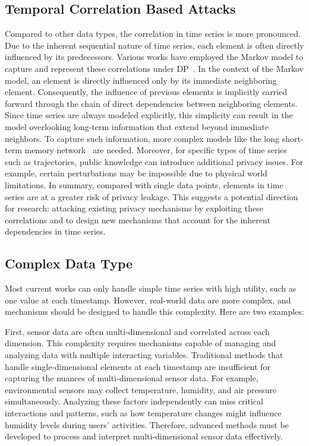 \subsection{Temporal Correlation Based Attacks}
Compared to other data types, the correlation in time series is more pronounced. Due to the inherent sequential nature of time series, each element is often directly influenced by its predecessors. Various works have employed the Markov model to capture and represent these correlations under DP~\cite{cao2017quantifying, xiao2017loclok, gursoy2018differentially}. In the context of the Markov model, an element is directly influenced only by its immediate neighboring element. Consequently, the influence of previous elements is implicitly carried forward through the chain of direct dependencies between neighboring elements.
Since time series are always modeled explicitly, this simplicity can result in the model overlooking long-term information that extend beyond immediate neighbors. To capture such information, more complex models like the long short-term memory network~\cite{shi2015convolutional} are needed. Moreover, for specific types of time series such as trajectories, public knowledge can introduce additional privacy issues. For example, certain perturbations may be impossible due to physical world limitations. In summary, compared with single data points, elements in time series are at a greater risk of privacy leakage. This suggests a potential direction for research: attacking existing privacy mechanisms by exploiting these correlations and to design new mechanisms that account for the inherent dependencies in time series. 



\subsection{Complex Data Type}
Most current works can only handle simple time series with high utility, such as one value at each timestamp. However, real-world data are more complex, and mechanisms should be designed to handle this complexity. Here are two examples:

First, sensor data are often multi-dimensional and correlated across each dimension. This complexity requires mechanisms capable of managing and analyzing data with multiple interacting variables. Traditional methods that handle single-dimensional elements at each timestamp are insufficient for capturing the nuances of multi-dimensional sensor data. For example, environmental sensors may collect temperature, humidity, and air pressure simultaneously. Analyzing these factors independently can miss critical interactions and patterns, such as how temperature changes might influence humidity levels during users' activities. Therefore, advanced methods must be developed to process and interpret multi-dimensional sensor data effectively.

